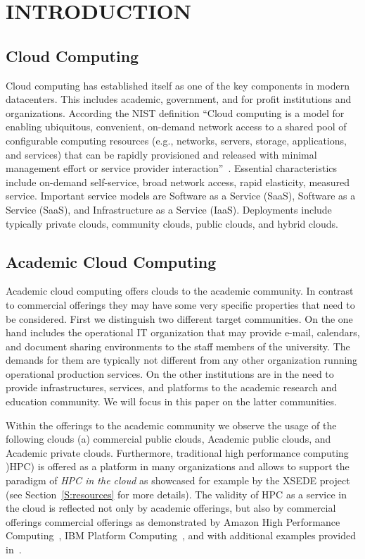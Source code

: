 \documentclass{sig-alternate-05-2015}
\begin{document}
\section{INTRODUCTION}

\subsection{Cloud Computing}

Cloud computing has established itself as one of the key components in
modern datacenters. This includes academic, government, and for profit
institutions and organizations.  According the NIST definition ``Cloud
computing is a model for enabling ubiquitous, convenient, on-demand
network access to a shared pool of configurable computing resources
(e.g., networks, servers, storage, applications, and services) that
can be rapidly provisioned and released with minimal management effort
or service provider interaction''~\cite{mell2011nist}. Essential
characteristics include on-demand self-service, broad network access,
rapid elasticity, measured service. Important service models are
Software as a Service (SaaS), Software as a Service (SaaS), and
Infrastructure as a Service (IaaS). Deployments include typically
private clouds, community clouds, public clouds, and hybrid clouds.

\subsection{Academic Cloud Computing}

Academic cloud computing offers clouds to the academic community. In
contrast to commercial offerings they may have some very specific
properties that need to be considered. First we distinguish two
different target communities. On the one hand includes the operational
IT organization that may provide e-mail, calendars, and document
sharing environments to the staff members of the university. The
demands for them are typically not different from any other
organization running operational production services. On the other
institutions are in the need to provide infrastructures, services, and
platforms to the academic research and education community. We will
focus in this paper on the latter communities.

Within the offerings to the academic community we observe the usage of
the following clouds (a) commercial public clouds, Academic public
clouds, and Academic private clouds. Furthermore, traditional high
performance computing )HPC) is offered as a platform in many
organizations and allows to support the paradigm of {\it HPC in the
  cloud} as showcased for example by the XSEDE project (see
Section~\ref {S:resources} for more details). The validity of HPC as a
service in the cloud is reflected not only by academic offerings, but
also by commercial offerings commercial offerings as demonstrated by
Amazon High Performance Computing~\cite{awshpc}, IBM Platform
Computing~\cite{ibmhpc}, and with additional examples provided
in~\cite{DouglasEadline}.
\end{document}
